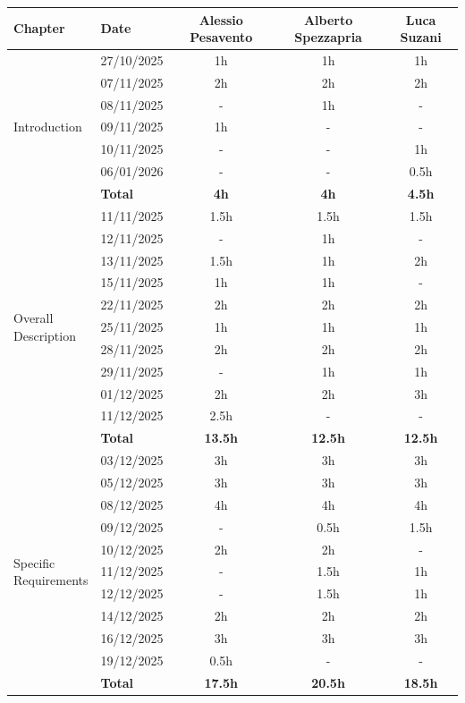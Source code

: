 \begin{table}[H]
\centering
\begin{tabular}{|l|l|c|c|c|}
\hline
\textbf{Chapter} & \textbf{Date} & \textbf{Alessio Pesavento} & \textbf{Alberto Spezzapria} & \textbf{Luca Suzani} \\ 
\hline

\multirow{7}{*}{Introduction} 
& 27/10/2025 & 1h & 1h & 1h \\ 
& 07/11/2025 & 2h & 2h & 2h \\ 
& 08/11/2025 & - & 1h & - \\ 
& 09/11/2025 & 1h & - & - \\ 
& 10/11/2025 & - & - & 1h \\ 
& 06/01/2026 & - & - & 0.5h \\
\cline{2-5}
& \textbf{Total} & \textbf{4h} & \textbf{4h} & \textbf{4.5h} \\ 
\hline

\multirow{11}{*}{\parbox{3cm}{Overall\\Description}} 
& 11/11/2025 & 1.5h & 1.5h & 1.5h \\ 
& 12/11/2025 & - & 1h & - \\ 
& 13/11/2025 & 1.5h & 1h & 2h \\
& 15/11/2025 & 1h & 1h & - \\ 
& 22/11/2025 & 2h & 2h & 2h \\ 
& 25/11/2025 & 1h & 1h & 1h \\ 
& 28/11/2025 & 2h & 2h & 2h \\
& 29/11/2025 & - & 1h & 1h \\
& 01/12/2025 & 2h & 2h & 3h \\
& 11/12/2025 & 2.5h & - & - \\
\cline{2-5}
& \textbf{Total} & \textbf{13.5h} & \textbf{12.5h} & \textbf{12.5h} \\ 
\hline

\multirow{11}{*}{\parbox{3cm}{Specific\\Requirements}}
& 03/12/2025 & 3h & 3h & 3h \\
& 05/12/2025 & 3h & 3h & 3h \\
& 08/12/2025 & 4h & 4h & 4h \\
& 09/12/2025 & - & 0.5h & 1.5h \\
& 10/12/2025 & 2h & 2h & - \\ 
& 11/12/2025 & - & 1.5h & 1h\\
& 12/12/2025 & - & 1.5h & 1h\\
& 14/12/2025 & 2h & 2h & 2h \\
& 16/12/2025 & 3h & 3h & 3h \\
& 19/12/2025 & 0.5h & - & -\\
\cline{2-5}
& \textbf{Total} & \textbf{17.5h} & \textbf{20.5h} & \textbf{18.5h} \\ 
\hline


\end{tabular}
\end{table}
